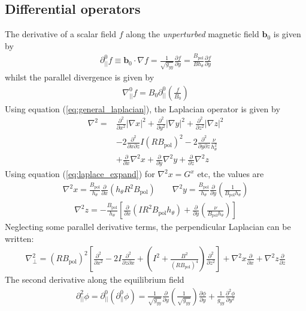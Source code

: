 \documentclass[12pt]{article}
\def\L{\left}
\def\R{\right}
\newcommand{\deriv}[2]{\ensuremath{\frac{\partial #1}{\partial #2}}}
\newcommand{\dderiv}[2]{\ensuremath{\frac{\partial^2 #1}{\partial {#2}^2}}}
\newcommand{\hthe}{\ensuremath{h_\theta}}
\newcommand{\Bp}{\ensuremath{B_{\text{pol}}}}
\newcommand{\ve}[1]{\ensuremath{\boldsymbol{#1}}}
\newcommand{\delp}{\nabla_\perp^2}
\newcommand{\rbp}{\ensuremath{R\Bp}}
\newcommand{\rbpsq}{\ensuremath{\L(\rbp\R)^2}}
\begin{document}
\subsection{Differential operators}
%
The derivative of a scalar field $f$ along the \emph{unperturbed} magnetic
field $\ve{b}_0$ is given by
%
\begin{align*}
\partial^0_{||}f \equiv \ve{b}_0 \cdot\nabla f =
\frac{1}{\sqrt{g_{yy}}}\deriv{f}{y} = \frac{\Bp}{B\hthe}\deriv{f}{y}
\end{align*}
%
whilst the parallel divergence is given by
%
\begin{align*}
\nabla^0_{||}f = B_0\partial^0_{||}\L(\frac{f}{B_0}\R)
\end{align*}
%
Using equation (\ref{eq:general_laplacian}), the Laplacian operator is given by
%
\begin{align*}
\nabla^2 = &\frac{\partial^2}{\partial x^2}\L|\nabla x\R|^2 +
    \frac{\partial^2}{\partial y^2}\L|\nabla y\R|^2 +
    \frac{\partial^2}{\partial z^2}\L|\nabla z\R|^2 \nonumber \\
    &-2\frac{\partial^2}{\partial x\partial z}I\L(R\Bp\R)^2 -
    2\frac{\partial^2}{\partial y\partial z}\frac{\nu}{h_\theta^2}\\
    &+\frac{\partial}{\partial x}\nabla^2x + \frac{\partial}{\partial
y}\nabla^2y + \frac{\partial}{\partial z}\nabla^2z \nonumber
\end{align*}
%
Using equation (\ref{eq:laplace_expand}) for $\nabla^2x = G^x$ etc, the
values are
%
\begin{align*}
\nabla^2x = \frac{\Bp}{h_\theta}\frac{\partial}{\partial x}\L(h_\theta
R^2\Bp\R) \qquad \nabla^2y = \frac{\Bp}{h_\theta}\frac{\partial}{\partial
y}\L(\frac{1}{\Bp h_\theta}\R)
\end{align*}
%
\begin{align*}
\nabla^2z = -\frac{\Bp}{h_\theta}\L[\frac{\partial}{\partial x}\L(IR^2\Bp
h_\theta\R) + \frac{\partial}{\partial y}\L(\frac{\nu}{\Bp
h_\theta}\R)\R]
\end{align*}
%
Neglecting some parallel derivative terms, the perpendicular Laplacian can be
written:
%
\begin{align*}
\delp = \rbpsq\L[\dderiv{}{x} - 2I\frac{\partial^2}{\partial z\partial x} +
\L(I^2 + \frac{B^2}{\L(\rbp\R)^4}\R)\dderiv{}{z}\R] +
\nabla^2 x \deriv{}{x} + \nabla^2 z\deriv{}{z}
\end{align*}
%
The second derivative along the equilibrium field
%
\begin{align*}
\partial^2_{||}\phi = \partial^0_{||}\L(\partial^0_{||}\phi\R) =
\frac{1}{\sqrt{g_{yy}}}\deriv{}{y}\L(\frac{1}{\sqrt{g_{yy}}}\R)\deriv{
\phi}{y} + \frac{1}{g_{yy}}\frac{\partial^2\phi}{\partial y^2}
\end{align*}
\end{document}
